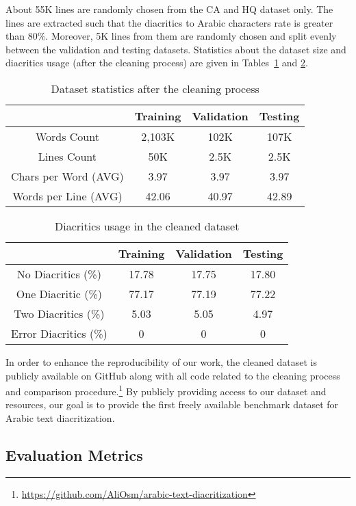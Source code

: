 \documentclass[conference]{IEEEtran}
\begin{document}
About 55K lines are randomly chosen from the CA and HQ dataset only. The lines are extracted such that the diacritics to Arabic characters rate is greater than 80\%. Moreover, 5K lines from them are randomly chosen and split evenly between the validation and testing datasets. Statistics about the dataset size and diacritics usage (after the cleaning process) are given in Tables~\ref{tab4_2a} and \ref{tab4_2b}.

\begin{table}
\centering
\caption{Dataset statistics after the cleaning process}
\label{tab4_2a}
\begin{tabular}{|c|c|c|c|}
\hline
 & Training & Validation & Testing \\ \hline
Words Count & 2,103K & 102K & 107K \\ \hline
Lines Count & 50K & 2.5K & 2.5K \\ \hline
Chars per Word (AVG) & 3.97 & 3.97 & 3.97 \\ \hline
Words per Line (AVG) & 42.06 & 40.97 & 42.89 \\ \hline
\end{tabular}
\end{table}

\begin{table}
\centering
\caption{Diacritics usage in the cleaned dataset}
\label{tab4_2b}
\begin{tabular}{|c|c|c|c|}
\hline
 & Training & Validation & Testing \\ \hline
No Diacritics (\%) & 17.78 & 17.75 & 17.80 \\ \hline
One Diacritic (\%) & 77.17 & 77.19 & 77.22 \\ \hline
Two Diacritics (\%) & 5.03 & 5.05 & 4.97 \\ \hline
Error Diacritics (\%) & 0 & 0 & 0  \\ \hline
\end{tabular}
\end{table}

In order to enhance the reproducibility of our work, the cleaned dataset is publicly available on GitHub along with all code related to the cleaning process and comparison procedure.\footnote{\url{https://github.com/AliOsm/arabic-text-diacritization}}
By publicly providing access to our dataset and resources, our goal is to provide the first freely available benchmark dataset for Arabic text diacritization. 


\subsection{Evaluation Metrics}
\end{document}
